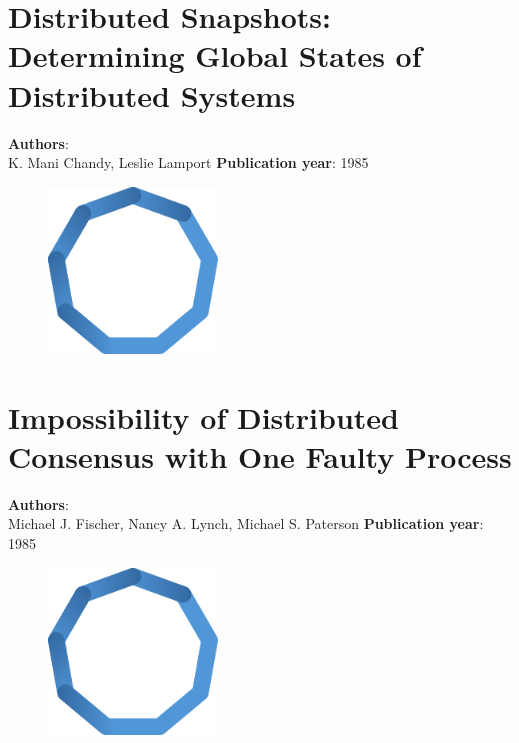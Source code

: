 \documentclass[11pt,fleqn]{book} %
\begin{document}
\chapter{Distributed Snapshots: Determining Global States of Distributed Systems}
\vspace*{-7mm}
\Large \textbf{Authors}: \\
K. Mani Chandy, Leslie Lamport
\newline\newline
\textbf{Publication year}: 1985
\begin{figure}[b]
    \centering
    \includegraphics[width=0.4\textwidth]{distributed-systems-blue.pdf}
\end{figure}


\chapter{Impossibility of Distributed Consensus with One Faulty Process}
\vspace*{-7mm}
\Large \textbf{Authors}: \\
Michael J. Fischer, Nancy A. Lynch, Michael S. Paterson
\newline\newline
\textbf{Publication year}: 1985
\begin{figure}[b]
    \centering
    \includegraphics[width=0.4\textwidth]{distributed-systems-blue.pdf}
\end{figure}

\end{document}
